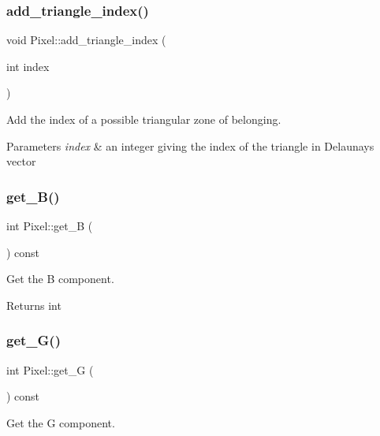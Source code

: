 \subsubsection{\texorpdfstring{add\+\_\+triangle\+\_\+index()}{add\_triangle\_index()}}
{\footnotesize\ttfamily void Pixel\+::add\+\_\+triangle\+\_\+index (\begin{DoxyParamCaption}\item[{int}]{index }\end{DoxyParamCaption})}



Add the index of a possible triangular zone of belonging. 


\begin{DoxyParams}{Parameters}
{\em index} & an integer giving the index of the triangle in Delaunay\textquotesingle{}s vector \\
\hline
\end{DoxyParams}
\mbox{\label{classPixel_a50ea40ab4b069cd9cebe3a4d006466b4}} 
\subsubsection{\texorpdfstring{get\+\_\+\+B()}{get\_B()}}
{\footnotesize\ttfamily int Pixel\+::get\+\_\+B (\begin{DoxyParamCaption}{ }\end{DoxyParamCaption}) const}



Get the B component. 

\begin{DoxyReturn}{Returns}
int 
\end{DoxyReturn}
\mbox{\label{classPixel_a7b8fb5740fe9ba2ff2960aa6d144cafe}} 
\subsubsection{\texorpdfstring{get\+\_\+\+G()}{get\_G()}}
{\footnotesize\ttfamily int Pixel\+::get\+\_\+G (\begin{DoxyParamCaption}{ }\end{DoxyParamCaption}) const}



Get the G component. 

